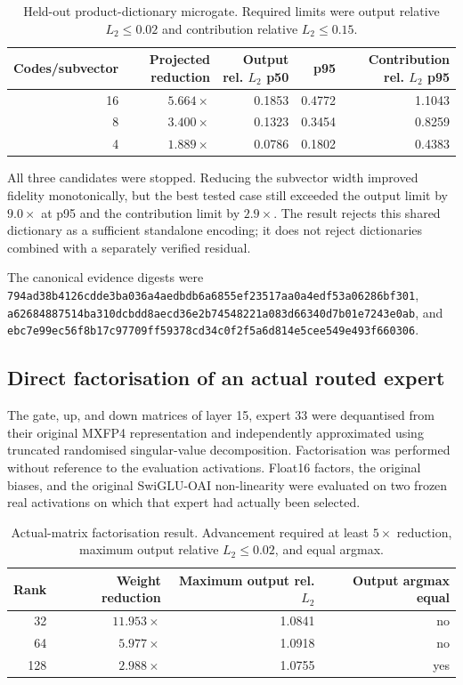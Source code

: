 \begin{table}[ht]
\centering
\begin{tabular}{@{}rrrrr@{}}
\toprule
Codes/subvector & Projected reduction & Output rel. $L_2$ p50 & p95 & Contribution rel. $L_2$ p95 \\
\midrule
16 & $5.664\times$ & 0.1853 & 0.4772 & 1.1043 \\
 8 & $3.400\times$ & 0.1323 & 0.3454 & 0.8259 \\
 4 & $1.889\times$ & 0.0786 & 0.1802 & 0.4383 \\
\bottomrule
\end{tabular}
\caption{Held-out product-dictionary microgate.  Required limits were output
relative $L_2\leq0.02$ and contribution relative $L_2\leq0.15$.}
\end{table}

All three candidates were stopped.  Reducing the subvector width improved
fidelity monotonically, but the best tested case still exceeded the output
limit by $9.0\times$ at p95 and the contribution limit by $2.9\times$.
The result rejects this shared dictionary as a sufficient standalone encoding;
it does not reject dictionaries combined with a separately verified residual.

The canonical evidence digests were
\texttt{794ad38b4126cdde3ba036a4aedbdb6a6855ef23517aa0a4edf53a06286bf301},
\texttt{a62684887514ba310dcbdd8aecd36e2b74548221a083d66340d7b01e7243e0ab},
and
\texttt{ebc7e99ec56f8b17c97709ff59378cd34c0f2f5a6d814e5cee549e493f660306}.

\subsection{Direct factorisation of an actual routed expert}

The gate, up, and down matrices of layer 15, expert 33 were dequantised from
their original MXFP4 representation and independently approximated using
truncated randomised singular-value decomposition.  Factorisation was performed
without reference to the evaluation activations.  Float16 factors, the original
biases, and the original SwiGLU-OAI non-linearity were evaluated on two frozen
real activations on which that expert had actually been selected.

\begin{table}[ht]
\centering
\begin{tabular}{@{}rrrr@{}}
\toprule
Rank & Weight reduction & Maximum output rel. $L_2$ & Output argmax equal \\
\midrule
32  & $11.953\times$ & 1.0841 & no \\
64  & $5.977\times$  & 1.0918 & no \\
128 & $2.988\times$  & 1.0755 & yes \\
\bottomrule
\end{tabular}
\caption{Actual-matrix factorisation result.  Advancement required at least
$5\times$ reduction, maximum output relative $L_2\leq0.02$, and equal argmax.}
\end{table}

